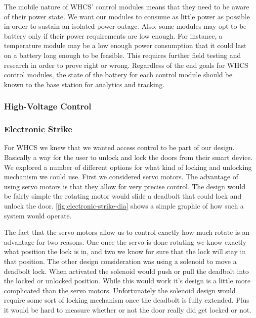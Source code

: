 The mobile nature of WHCS' control modules means that they need to be aware of
their power state. We want our modules to consume as little power as possible
in order to sustain an isolated power outage. Also, some modules may opt to be
battery only if their power requirements are low enough. For instance, a
temperature module may be a low enough power consumption that it could last on
a battery long enough to be feasible. This requires further field testing and
research in order to prove right or wrong. Regardless of the end goals for WHCS
control modules, the state of the battery for each control module should be
known to the base station for analytics and tracking.

\subsubsection{High-Voltage Control}

\subsubsection{Electronic Strike}

\label{sec:electronic-strike}

For WHCS we knew that we wanted access control to be part of our design.
Basically a way for the user to unlock and lock the doors from their smart
device. We explored a number of different options for what kind of locking and
unlocking mechanism we could use. First we considered servo motors. The
advantage of using servo motors is that they allow for very precise control.
The design would be fairly simple the rotating motor would slide a deadbolt
that could lock and unlock the door. \autoref{fig:electronic-strike-dia} shows a simple
graphic of how such a system would operate.

 
The fact that the servo motors allow us to control exactly how much rotate is
an advantage for two reasons. One once the servo is done rotating we know
exactly what position the lock is in, and two we know for sure that the lock
will stay in that position. The other design consideration was using a solenoid
to move a deadbolt lock. When activated the solenoid would push or pull the
deadbolt into the locked or unlocked position. While this would work it{}'s
design is a little more complicated than the servo motors. Unfortunately the
solenoid design would require some sort of locking mechanism once the deadbolt
is fully extended. Plus it would be hard to measure whether or not the door
really did get locked or not.

